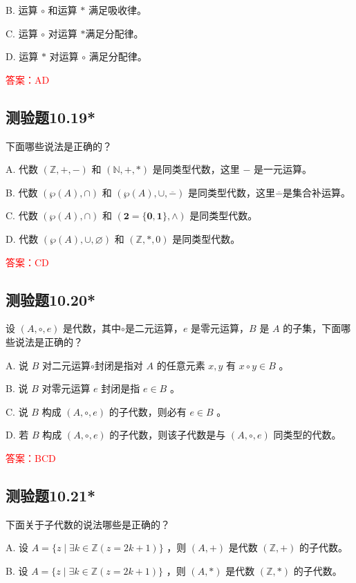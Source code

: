\documentclass[UTF8, heading=true]{ctexart}
\begin{document}
B. 运算 $\circ$ 和运算 $*$ 满足吸收律。

C. 运算 $\circ$ 对运算 $*$满足分配律。

D. 运算 $*$ 对运算 $\circ$ 满足分配律。

\textcolor{red}{答案：AD}

\subsection{测验题10.19*}

下面哪些说法是正确的？

A. 代数 $(\mathbb{Z},+,-)$ 和 $(\mathbb{N},+, *)$ 是同类型代数，这里 $-$ 是一元运算。

B. 代数 $(\wp(A), \cap)$ 和 $(\wp(A), \cup, \overline{-})$ 是同类型代数，这里$\overline{-}$是集合补运算。

C. 代数 $(\wp(A), \cap)$ 和 $(\mathbf{2}=\{\mathbf{0}, \mathbf{1}\}, \wedge)$ 是同类型代数。

D. 代数 $(\wp(A), \cup, \varnothing)$ 和 $(\mathbb{Z}, *, 0)$ 是同类型代数。

\textcolor{red}{答案：CD}

\subsection{测验题10.20*}

设 $(A, \circ, e)$ 是代数，其中$\circ$是二元运算，$e$ 是零元运算，$B$ 是 $A$ 的子集，下面哪些说法是正确的？

A. 说 $B$ 对二元运算$\circ$封闭是指对 $A$ 的任意元素 $x, y$ 有 $x \circ y \in B$ 。

B. 说 $B$ 对零元运算 $e$ 封闭是指 $e \in B$ 。

C. 说 $B$ 构成 $(A, \circ, e)$ 的子代数，则必有 $e \in B$ 。

D. 若 $B$ 构成 $(A, \circ, e)$ 的子代数，则该子代数是与 $(A, \circ, e)$ 同类型的代数。

\textcolor{red}{答案：BCD}

\subsection{测验题10.21*}

下面关于子代数的说法哪些是正确的？

A. 设 $A=\{z \mid \exists k \in \mathbb{Z}(z=2 k+1)\}$ ，则 $(A,+)$ 是代数 $(\mathbb{Z},+)$ 的子代数。

B. 设 $A=\{z \mid \exists k \in \mathbb{Z}(z=2 k+1)\}$ ，则 $(A, *)$ 是代数 $(\mathbb{Z}, *)$ 的子代数。
\end{document}
